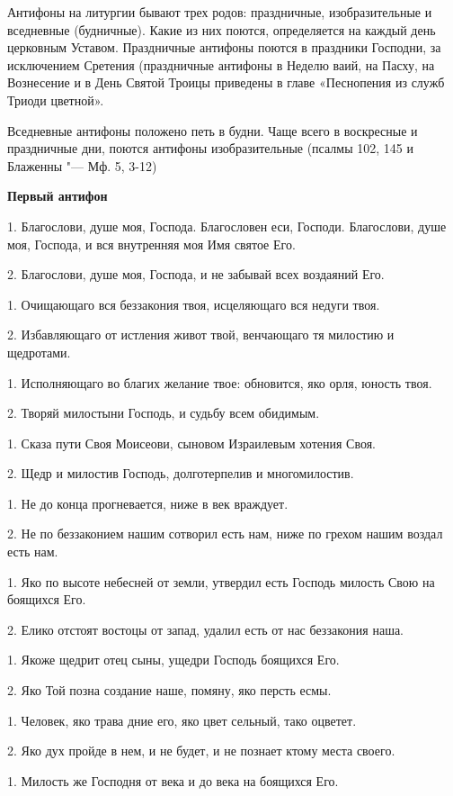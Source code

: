 Антифоны на литургии бывают трех родов: праздничные, изобразительные и вседневные (будничные). Какие из них поются, определяется на каждый день церковным Уставом. Праздничные антифоны поются в праздники Господни, за исключением Сретения (праздничные антифоны в Неделю ваий, на Пасху, на Вознесение и в День Святой Троицы приведены в главе «Песнопения из служб Триоди цветной».


Вседневные антифоны положено петь в будни. Чаще всего в воскресные и праздничные дни, поются антифоны изобразительные (псалмы 102, 145 и Блаженны "--- Мф. 5, 3-12)


\medskip
\bfseries Первый антифон \normalfont{}\nopagebreak


1. Благослови, душе моя, Господа. Благословен еси, Господи. Благослови, душе моя, Господа, и вся внутренняя моя Имя святое Его. 


2. Благослови, душе моя, Господа, и не забывай всех воздаяний Его. 


1. Очищающаго вся беззакония твоя,  исцеляющаго вся недуги твоя. 


2. Избавляющаго от истления живот твой,  венчающаго тя милостию и щедротами. 


1. Исполняющаго во благих желание твое:  обновится, яко орля, юность твоя. 


2. Творяй милостыни Господь, и судьбу всем обидимым. 


1. Сказа пути Своя Моисеови, сыновом Израилевым хотения Своя. 


2. Щедр и милостив Господь, долготерпелив и многомилостив.


1. Не до конца прогневается, ниже в век враждует. 


2. Не по беззаконием нашим сотворил есть нам, ниже по грехом нашим воздал есть нам. 


1. Яко по высоте небесней от земли,  утвердил есть Господь милость Свою на боящихся Его. 


2. Елико отстоят востоцы от запад,  удалил есть от нас беззакония наша. 


1. Якоже щедрит отец сыны, ущедри Господь боящихся Его. 


2. Яко Той позна создание наше, помяну, яко персть есмы. 


1. Человек, яко трава дние его, яко цвет сельный, тако оцветет. 


2. Яко дух пройде в нем, и не будет, и не познает ктому места своего. 


1. Милость же Господня от века и до века на боящихся Его. 


